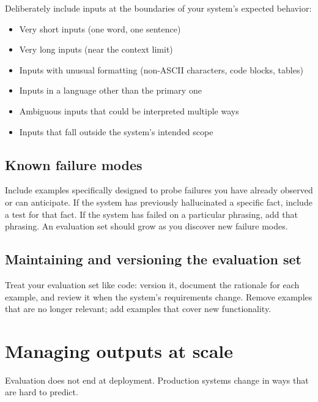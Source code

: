 Deliberately include inputs at the boundaries of your system's expected behavior:

\begin{itemize}[noitemsep,topsep=0pt]
  \item Very short inputs (one word, one sentence)
  \item Very long inputs (near the context limit)
  \item Inputs with unusual formatting (non-ASCII characters, code blocks, tables)
  \item Inputs in a language other than the primary one
  \item Ambiguous inputs that could be interpreted multiple ways
  \item Inputs that fall outside the system's intended scope
\end{itemize}

\subsection{Known failure modes}

Include examples specifically designed to probe failures you have already observed or can anticipate. If the system has previously hallucinated a specific fact, include a test for that fact. If the system has failed on a particular phrasing, add that phrasing. An evaluation set should grow as you discover new failure modes.

\subsection{Maintaining and versioning the evaluation set}

Treat your evaluation set like code: version it, document the rationale for each example, and review it when the system's requirements change. Remove examples that are no longer relevant; add examples that cover new functionality.


\section{Managing outputs at scale}

Evaluation does not end at deployment. Production systems change in ways that are hard to predict.

